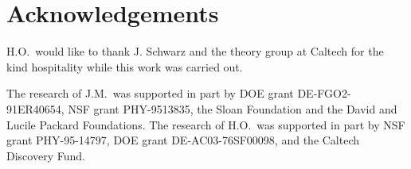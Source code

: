 \section*{Acknowledgements}


H.O.\ would like to thank J. Schwarz and 
the theory group at Caltech for the kind hospitality
while this work was carried out. 

The research of J.M.\ 
was supported in part by DOE grant DE-FGO2-91ER40654,
 NSF grant PHY-9513835, the Sloan Foundation and the 
 David and Lucile Packard Foundations. 
The research of H.O.\ was supported in part by 
NSF grant PHY-95-14797, DOE grant DE-AC03-76SF00098,
and the Caltech Discovery Fund. 





\renewcommand{\baselinestretch}{0.87}























